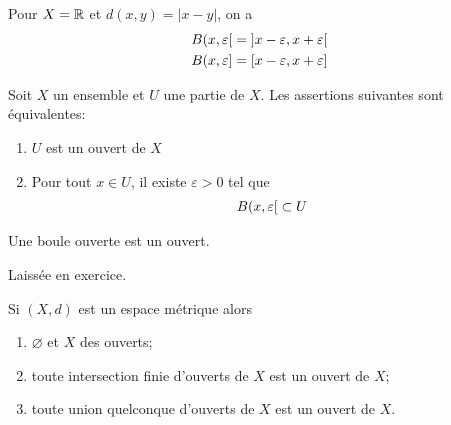 \documentclass[french,a4paper,10pt]{article}
\begin{document}
	\begin{example}
		Pour $X=\mathbb{R}$ et $d(x,y)=|x-y|$, on a
		\[\begin{aligned}
			B(x,\varepsilon\mathopen{}[\mathclose{}=\mathopen{]}x-\varepsilon, x+\varepsilon\mathclose{[}\\
			B(x,\varepsilon\mathopen{}]\mathclose{}=\mathopen{[}x-\varepsilon, x+\varepsilon\mathclose{]}
		\end{aligned}\]
	\end{example}
	
	\begin{definition}
		Soit $X$ un ensemble et $U$ une partie de $X$. Les assertions suivantes sont équivalentes:
		\begin{enumerate}[label=$(\roman*)$]
			\item $U$ est un ouvert de $X$
			\item Pour tout $x\in U$, il existe $\varepsilon>0$ tel que
			\[\begin{aligned}
				B({x,\varepsilon}\mathopen{}[\mathclose{}\subset U
			\end{aligned}\]
		\end{enumerate}
	\end{definition}
	
	
	\begin{example}
		Une boule ouverte est un ouvert.
	\end{example}
	\begin{myproof}
		Laissée en exercice.
	\end{myproof}
	
	\begin{remark}
		Si $(X,d)$ est un espace métrique alors
		\begin{enumerate}
			\item $\varnothing$ et $X$ des ouverts;
			\item toute intersection finie d'ouverts de $X$ est un ouvert de $X$;
			\item toute union quelconque d'ouverts de $X$ est un ouvert de $X$.
		\end{enumerate}
	\end{remark}
	
\end{document}
